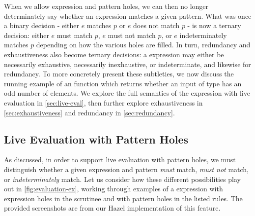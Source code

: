 When we allow expression and pattern holes, we can then no longer determinately say whether an expression matches a given pattern. What was once a binary decision - either $e$ matches $p$ or $e$ does not match $p$ - is now a ternary decision: either $e$ must match $p$, $e$ must not match $p$, or $e$ indeterminately matches $p$ depending on how the various holes are filled. In turn, redundancy and exhaustiveness also become ternary decisions: a  expression may either be necessarily exhaustive, necessarily inexhaustive, or indeterminate, and likewise for redundancy. To more concretely present these subtleties, we now discuss the running example of an  function which returns whether an input of type \li{[Int]} has an odd number of elements. We explore the full semantics of the  expression with live evaluation in \autoref{sec:live-eval}, then further explore exhaustiveness in \autoref{sec:exhaustiveness} and redundancy in \autoref{sec:redundancy}.

\subsection{Live Evaluation with Pattern Holes}\label{sec:live-eval}

As discussed, in order to support live evaluation with pattern holes, we must distinguish whether a given expression and pattern \emph{must} match, \emph{must not} match, or \emph{indeterminately} match. Let us consider how these different possibilities play out in \autoref{fig:evaluation-ex}, working through examples of a  expression with expression holes in the scrutinee and with pattern holes in the listed rules. The provided screenshots are from our Hazel implementation of this feature.

